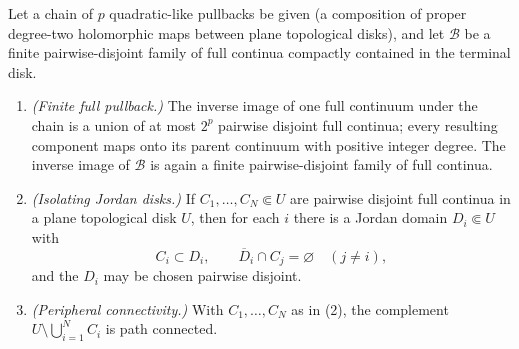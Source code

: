 \begin{lemma}
\label{lem:peripheral-isolation}
Let a chain of \(p\) quadratic-like pullbacks be given (a composition
of proper degree-two holomorphic maps between plane topological
disks), and let \(\mathcal B\) be a finite pairwise-disjoint family of
full continua compactly contained in the terminal disk.
\begin{enumerate}
\item \emph{(Finite full pullback.)}  The inverse image of one full
      continuum under the chain is a union of at most \(2^p\) pairwise
      disjoint full continua; every resulting component maps onto its
      parent continuum with positive integer degree.  The inverse image
      of \(\mathcal B\) is again a finite pairwise-disjoint family of
      full continua.
\item \emph{(Isolating Jordan disks.)}  If \(C_1,\dots,C_N\Subset U\)
      are pairwise disjoint full continua in a plane topological disk
      \(U\), then for each \(i\) there is a Jordan domain
      \(D_i\Subset U\) with
      \[
       C_i\subset D_i,\qquad
       \overline D_i\cap C_j=\varnothing\quad(j\ne i),
      \]
      and the \(D_i\) may be chosen pairwise disjoint.
\item \emph{(Peripheral connectivity.)}  With \(C_1,\dots,C_N\) as in
      (2), the complement \(U\setminus\bigcup_{i=1}^N C_i\) is path
      connected.
\end{enumerate}
\end{lemma}


